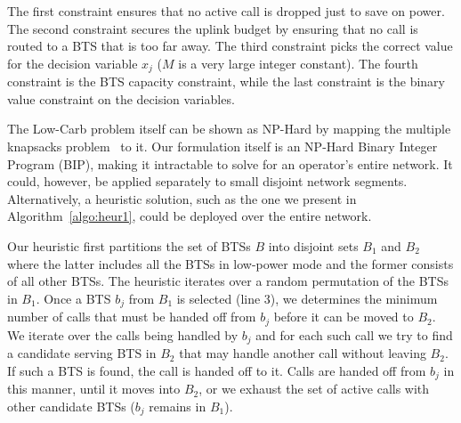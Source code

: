The first constraint ensures that no active call is
dropped just to save on power. The second constraint secures
the uplink budget by ensuring that no call is routed to a BTS
that is too far away. The third constraint picks the correct
value for the decision variable $x_j$ ($M$ is a very large integer constant). The fourth constraint is the BTS capacity constraint, while the last
constraint is the binary value constraint on the decision
variables.

The Low-Carb problem itself can be shown as NP-Hard by mapping the multiple knapsacks problem~\cite{kellerer:knapsackproblems:2005} to it. Our formulation itself is an NP-Hard Binary Integer Program
(BIP), making it intractable to solve for an
operator's entire network. It could, however, be applied separately to small disjoint network segments. Alternatively, a heuristic solution, such as the one we present in Algorithm~\ref{algo:heur1}, could be deployed over the entire network.

Our heuristic first partitions the set of BTSs $B$ into disjoint sets $B_1$ and $B_2$ where the latter includes all the BTSs in low-power mode and the former consists of all other BTSs. The heuristic iterates over a random permutation of the BTSs in $B_1$. Once a BTS $b_j$ from $B_1$ is selected (line 3), we determines the minimum number of calls that must be handed off from $b_j$ before it can be moved to $B_2$. We iterate over the calls being handled by $b_j$ and for each such call we try to find a candidate serving BTS in $B_2$ that may handle another call without leaving $B_2$. If such a BTS is found, the call is handed off to it. Calls are handed off from $b_j$ in this manner, until it moves into $B_2$, or we exhaust the set of active calls with other candidate BTSs ($b_j$ remains in $B_1$). 

